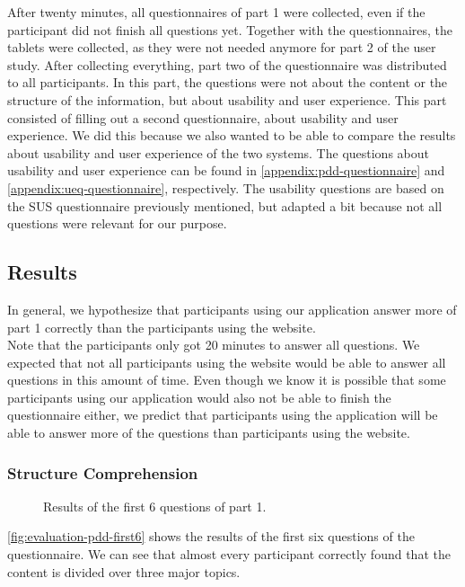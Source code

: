 After twenty minutes, all questionnaires of part 1 were collected, even if the participant did not finish all questions yet. Together with the questionnaires, the tablets were collected, as they were not needed anymore for part 2 of the user study. After collecting everything, part two of the questionnaire was distributed to all participants. In this part, the questions were not about the content or the structure of the information, but about usability and user experience. This part consisted of filling out a second questionnaire, about usability and user experience. We did this because we also wanted to be able to compare the results about usability and user experience of the two systems. The questions about usability and user experience can be found in \autoref{appendix:pdd-questionnaire} and \autoref{appendix:ueq-questionnaire}, respectively. The usability questions are based on the SUS questionnaire previously mentioned, but adapted a bit because not all questions were relevant for our purpose.



\subsection{Results}
In general, we hypothesize that participants using our application answer more of part 1 correctly than the participants using the website.\\

Note that the participants only got 20 minutes to answer all questions. We expected that not all participants using the website would be able to answer all questions in this amount of time. Even though we know it is possible that some participants using our application would also not be able to finish the questionnaire either, we predict that participants using the application will be able to answer more of the questions than participants using the website.

\subsubsection{Structure Comprehension}

\begin{figure}[H]
	\centering
	\caption{Results of the first 6 questions of part 1.}
	\label{fig:evaluation-pdd-first6}
\end{figure}

\autoref{fig:evaluation-pdd-first6} shows the results of the first six questions of the questionnaire. We can see that almost every participant correctly found that the content is divided over three major topics.\\

